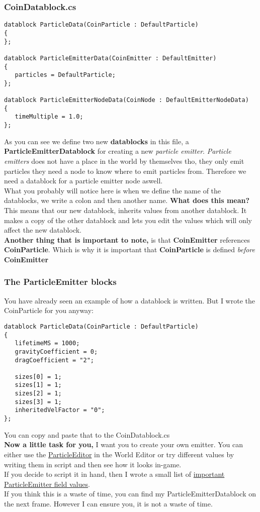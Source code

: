 \begin{frame}[fragile]
\frametitle{CoinDatablock.cs}
\TS
\begin{lstlisting}
datablock ParticleData(CoinParticle : DefaultParticle)
{
};

datablock ParticleEmitterData(CoinEmitter : DefaultEmitter)
{
   particles = DefaultParticle;
};

datablock ParticleEmitterNodeData(CoinNode : DefaultEmitterNodeData)
{
   timeMultiple = 1.0;
};
\end{lstlisting}
As you can see we define two new {\bf datablocks} in this file, a {\bf ParticleEmitterDatablock} for creating a new {\it particle emitter}. {\it Particle emitters}
does not have a place in the world by themselves tho, they only emit particles they need a node to know where to emit particles from.
Therefore we need a datablock for a particle emitter node aswell.\\
What you probably will notice here is when we define the name of the datablocks, we write a colon and then another name. {\bf What does this mean?}\\
This means that our new datablock, inherits values from another datablock. It makes a copy of the other datablock and lets you edit
the values which will only affect the new datablock.\\
{\bf Another thing that is important to note,} is that {\bf CoinEmitter} references {\bf CoinParticle}. Which is why it is important that
{\bf CoinParticle} is defined {\it before} {\bf CoinEmitter}
\end{frame}

\begin{frame}[fragile]
\frametitle{The ParticleEmitter blocks}
You have already seen an example of how a datablock is written. But I wrote the CoinParticle for you anyway:\\
\TS
\begin{lstlisting}
datablock ParticleData(CoinParticle : DefaultParticle)
{
   lifetimeMS = 1000;
   gravityCoefficient = 0;
   dragCoefficient = "2";
   
   sizes[0] = 1;
   sizes[1] = 1;
   sizes[2] = 1;
   sizes[3] = 1;
   inheritedVelFactor = "0";
};
\end{lstlisting}
You can copy and paste that to the CoinDatablock.cs\\
{\bf Now a little task for you,} I want you to create your own emitter. You can either use the 
{\color{blue} \href{http://docs.garagegames.com/torque-3d/official/content/documentation/World\%20Editor/Editors/ParticleEditor.html}{ParticleEditor}}
in the World Editor or try different values by writing them in script and then see how it looks in-game.\\
If you decide to script it in hand, then I wrote a small list of {\color{blue}\hyperlink{QG-pNode}{important ParticleEmitter field values}}.\\
If you think this is a waste of time, you can find my ParticleEmitterDatablock on the next frame. However I can ensure you, it is not a waste of time.
\end{frame}


